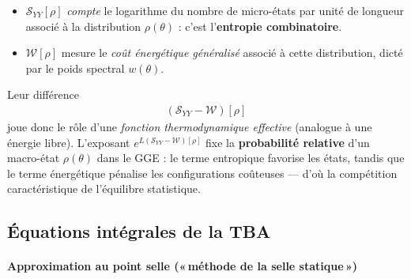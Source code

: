 \begin{itemize}[label = $\bullet$] 
\item $\mathcal{S}_{YY}[\rho]$ \emph{compte} le logarithme du nombre de
      micro-états par unité de longueur associé à la distribution $\rho(\theta)$ :
      c’est l’\textbf{entropie combinatoire}.
\item $\mathcal{W}[\rho]$ mesure le \emph{coût énergétique généralisé}
      associé à cette distribution, dicté par le poids spectral $w(\theta)$.
\end{itemize}

\medskip

Leur différence
\begin{eqnarray}
	(\mathcal{S}_{YY}-\mathcal{W})[\rho]	
\end{eqnarray}
joue donc le rôle d’une \emph{fonction thermodynamique effective} (analogue à une énergie libre).  
L’exposant $e^{L(\mathcal{S}_{YY}-\mathcal{W})[\rho]}$ fixe la \textbf{probabilité relative} d’un macro-état $\rho(\theta)$ dans le \gls{GGE} : le terme entropique favorise les états, tandis que le terme énergétique pénalise les configurations coûteuses — d’où la compétition caractéristique de l’équilibre statistique.






%
\subsection{Équations intégrales de la TBA}


\paragraph{Approximation au point selle («\,méthode de la selle statique\,»)}

